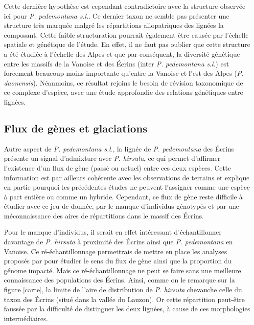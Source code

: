 Cette dernière hypothèse est cependant contradictoire avec la structure observée ici pour \textit{P. pedemontana s.l.}. Ce dernier taxon ne semble pas présenter une structure très marquée malgré les répartitions allopatriques des lignées la composant. Cette faible structuration pourrait également être causée par l'échelle spatiale et génétique de l'étude. En effet, il ne faut pas oublier que cette structure a été étudiée à l'échelle des Alpes et que par conséquent, la diversité génétique entre les massifs de la Vanoise et des Écrins (inter \textit{P. pedemontana s.l.}) est forcement beaucoup moins importante qu'entre la Vanoise et l'est des Alpes (\textit{P. daonensis}). Néanmoins, ce résultat rejoins le besoin de révision taxonomique de ce complexe d'espèce, avec une étude approfondie des relations génétiques entre lignées. 

\subsection{Flux de gènes et glaciations}

Autre aspect de \textit{P. pedemontana s.l.}, la lignée de \textit{P. pedemontana} des Écrins présente un signal d'admixture avec \textit{P. hirsuta}, ce qui permet d'affirmer l'existence d'un flux de gène (passé ou actuel) entre ces deux espèces. Cette information est par ailleurs cohérente avec les observations de terrains et explique en partie pourquoi les précédentes études ne peuvent l'assigner comme une espèce à part entière ou comme un hybride. Cependant, ce flux de gène reste difficile à étudier avec ce jeu de donnée, par le manque d'individus génotypés et par une méconnaissance des aires de répartitions dans le massif des Écrins. 

Pour le manque d'individus, il serait en effet intéressant d'échantillonner davantage de \textit{P. hirsuta} à proximité des Écrins ainsi que \textit{P. pedemontana} en Vanoise. Ce ré-échantillonnage permettrais de mettre en place les analyses proposés par \citet{Eaton2015} pour étudier le sens du flux de gène ainsi que la proportion du génome impacté. Mais ce ré-échantillonnage ne peut se faire sans une meilleure connaissance des populations des Écrins. Ainsi, comme on le remarque sur la figure \ref{carte}, la limite de l'aire de distribution de \textit{P. hirsuta} chevauche celle du taxon des Écrins (situé dans la vallée du Lauzon). Or cette répartition peut-être faussée par la difficulté de distinguer les deux lignées, à cause de ces morphologies intermédiaires.

